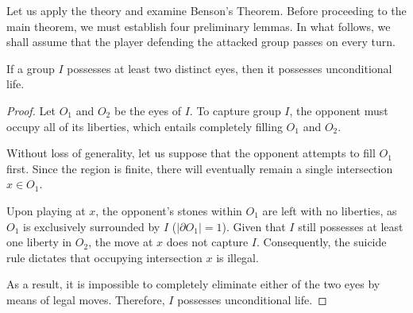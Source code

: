 Let us apply the theory and examine Benson's Theorem. Before proceeding to the main theorem, we must establish four preliminary lemmas. In what follows, we shall assume that the player defending the attacked group passes on every turn.

\begin{lemma}\label{lem_1_benson}
	If a group \(I\) possesses at least two distinct eyes, then it possesses unconditional life.
\end{lemma}


\begin{proof}
	Let \(O_1\) and \(O_2\) be the eyes of \(I\). To capture group \(I\), the opponent must occupy all of its liberties, which entails completely filling \(O_1\) and \(O_2\).
	
	Without loss of generality, let us suppose that the opponent attempts to fill \(O_1\) first. Since the region is finite, there will eventually remain a single intersection \(x \in O_1\).
	
	Upon playing at \(x\), the opponent's stones within \(O_1\) are left with no liberties, as \(O_1\) is exclusively surrounded by \(I\) (\(|\partial O_1| = 1\)). Given that \(I\) still possesses at least one liberty in \(O_2\), the move at \(x\) does not capture \(I\). Consequently, the suicide rule dictates that occupying intersection \(x\) is illegal.
	
	As a result, it is impossible to completely eliminate either of the two eyes by means of legal moves. Therefore, \(I\) possesses unconditional life.
\end{proof}
